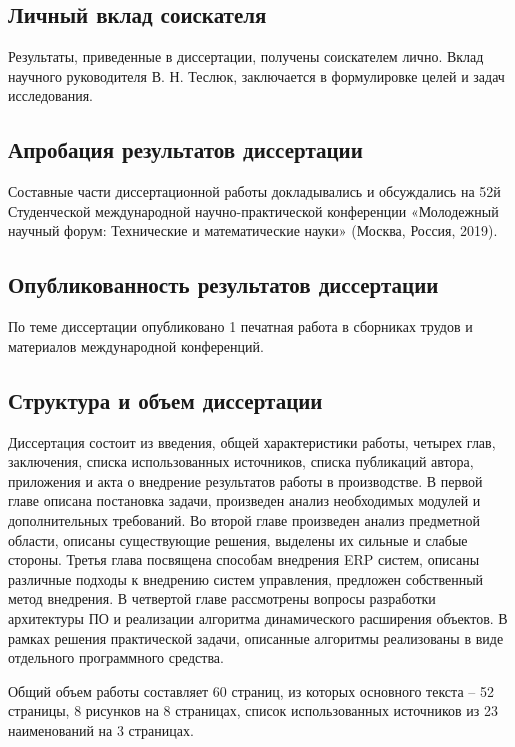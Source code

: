 \subsection*{Личный вклад соискателя}

Результаты, приведенные в диссертации, получены  соискателем лично.
Вклад научного руководителя В. Н. Теслюк, заключается в формулировке целей и задач исследования.

\subsection*{Апробация результатов диссертации}

Составные части диссертационной работы докладывались и обсуждались
на 52й Студенческой международной научно-практической конференции
«Молодежный научный форум: Технические и математические науки» (Москва, Россия, 2019).

\subsection*{Опубликованность результатов диссертации}

По теме диссертации опубликовано 1 печатная работа в сборниках трудов и материалов
международной конференций.


\subsection*{Структура и объем диссертации}

Диссертация состоит из введения, общей характеристики работы, четырех глав, заключения,
списка использованных источников, списка публикаций автора, приложения и акта о внедрение результатов
работы в производстве. В первой главе описана постановка задачи, произведен анализ необходимых
модулей и дополнительных требований. Во второй главе произведен анализ предметной области,
описаны существующие решения, выделены их сильные и слабые стороны.
Третья глава посвящена способам внедрения ERP систем, описаны различные подходы к внедрению
систем управления, предложен собственный метод внедрения.
В четвертой главе рассмотрены вопросы разработки архитектуры ПО и реализации алгоритма
динамического расширения объектов.
В рамках решения практической задачи, описанные алгоритмы реализованы в виде отдельного
программного средства.

Общий объем работы составляет 60 страниц, из которых основного текста – 52 страницы,
8 рисунков на 8 страницах, список использованных источников из 23 наименований на 3 страницах.
